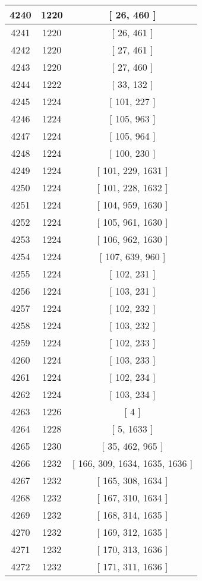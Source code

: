 \begin{center}
\begin{longtable}[H]{|| c c c ||}
4240 & 1220 & [ 26, 460 ] \\ 
\hline
4241 & 1220 & [ 26, 461 ] \\ 
\hline
4242 & 1220 & [ 27, 461 ] \\ 
\hline
4243 & 1220 & [ 27, 460 ] \\ 
\hline
4244 & 1222 & [ 33, 132 ] \\ 
\hline
4245 & 1224 & [ 101, 227 ] \\ 
\hline
4246 & 1224 & [ 105, 963 ] \\ 
\hline
4247 & 1224 & [ 105, 964 ] \\ 
\hline
4248 & 1224 & [ 100, 230 ] \\ 
\hline
4249 & 1224 & [ 101, 229, 1631 ] \\ 
\hline
4250 & 1224 & [ 101, 228, 1632 ] \\ 
\hline
4251 & 1224 & [ 104, 959, 1630 ] \\ 
\hline
4252 & 1224 & [ 105, 961, 1630 ] \\ 
\hline
4253 & 1224 & [ 106, 962, 1630 ] \\ 
\hline
4254 & 1224 & [ 107, 639, 960 ] \\ 
\hline
4255 & 1224 & [ 102, 231 ] \\ 
\hline
4256 & 1224 & [ 103, 231 ] \\ 
\hline
4257 & 1224 & [ 102, 232 ] \\ 
\hline
4258 & 1224 & [ 103, 232 ] \\ 
\hline
4259 & 1224 & [ 102, 233 ] \\ 
\hline
4260 & 1224 & [ 103, 233 ] \\ 
\hline
4261 & 1224 & [ 102, 234 ] \\ 
\hline
4262 & 1224 & [ 103, 234 ] \\ 
\hline
4263 & 1226 & [ 4 ] \\ 
\hline
4264 & 1228 & [ 5, 1633 ] \\ 
\hline
4265 & 1230 & [ 35, 462, 965 ] \\ 
\hline
4266 & 1232 & [ 166, 309, 1634, 1635, 1636 ] \\ 
\hline
4267 & 1232 & [ 165, 308, 1634 ] \\ 
\hline
4268 & 1232 & [ 167, 310, 1634 ] \\ 
\hline
4269 & 1232 & [ 168, 314, 1635 ] \\ 
\hline
4270 & 1232 & [ 169, 312, 1635 ] \\ 
\hline
4271 & 1232 & [ 170, 313, 1636 ] \\ 
\hline
4272 & 1232 & [ 171, 311, 1636 ] \\ 

\end{longtable}
\end{center}

